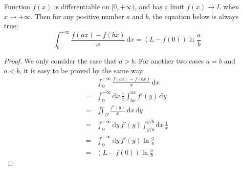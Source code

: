 \documentclass[10pt,a4paper]{article}
\author{wwylele}
\begin{document}
	\newcommand{\ud}{\mathrm{d}}
	Function $f(x)$ is differentiable on $[0,+\infty)$, and has a limit $f(x)\rightarrow L$ when $x\rightarrow +\infty$. Then for any positive number $a$ and $b$, the equation below is always true:
	\[
	\int_{0}^{+\infty}\frac{f(ax)-f(bx)}{x}\,\ud x=(L-f(0))\ln \frac{a}{b}
	\]
	\begin{proof}
		We only consider the case that $a>b$. For another two cases $a=b$ and $a<b$, it is easy to be proved by the same way.
		\begin{align*}
		&\int_{0}^{+\infty}\frac{f(ax)-f(bx)}{x}\,\ud x \\
		=&\int_{0}^{+\infty}\ud x\,\frac{1}{x}\int_{bx}^{ax}f'(y)\,\ud y\\
		=&\iint_{\Omega}\frac{f'(y)}{x}\,\ud x\,\ud y\\
		=&\int_{0}^{+\infty}\ud y\,f'(y)\int_{y/a}^{y/b}\ud x\,\frac{1}{x}\\
	    =&\int_{0}^{+\infty}\ud y\,f'(y)\ln\frac{a}{b}\\
	    =&(L-f(0))\ln \frac{a}{b}
		\end{align*}
	\end{proof}
\end{document}
